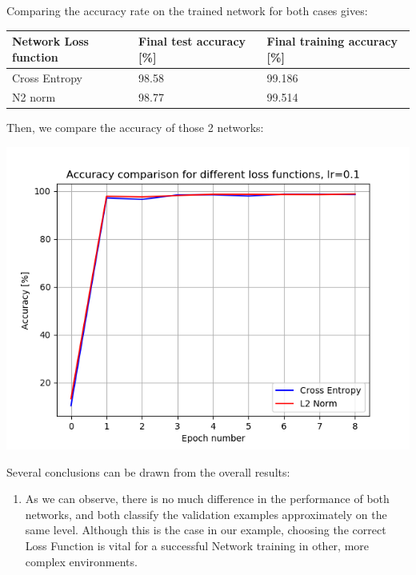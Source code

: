 \documentclass[a4paper]{iacas}
\begin{document}
Comparing the accuracy rate on the trained network for both cases gives:

\begin{table}[]
\begin{tabular}{|l|l|l|}
\hline
Network Loss function & Final test accuracy {[}\%{]} & Final training accuracy {[}\%{]} \\ \hline
Cross Entropy         & 98.58                        & 99.186                           \\ \hline
N2 norm               & 98.77                        & 99.514                           \\ \hline
\end{tabular}
\end{table}


Then, we compare the accuracy of those 2 networks:
\vskip 0.1in
\begin{minipage}{\linewidth}
	\includegraphics[scale=0.8]{hw2_py/results/_14_01_43/comparison/accuracy_1_4.png}
	\label{fig_18}
\end{minipage}
\vskip 0.1in



Several conclusions can be drawn from the overall results:

\begin{enumerate}
\item As we can observe, there is no much difference in the performance of both networks, and both classify the validation examples approximately on the same level. Although this is the case in our example, choosing the correct Loss Function is vital for a successful Network training in other, more complex environments.
\end{enumerate}
\end{document}
